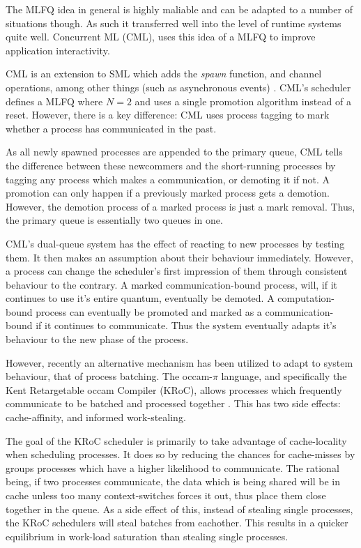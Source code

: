 The MLFQ idea in general is highly maliable and can be adapted to a number of 
situations though. As such it transferred well into the level of runtime 
systems quite well. Concurrent ML (CML), uses this idea of a MLFQ to improve 
application interactivity. 

CML is an extension to SML which adds the \emph{spawn} function, and channel 
operations, among other things (such as asynchronous events) 
\cite{reppy1993concurrent}. CML's scheduler defines a MLFQ where $N=2$ and 
uses a single promotion algorithm instead of a reset. However, there is a key
difference: CML uses process tagging to mark whether a process has 
communicated in the past. 

As all newly spawned processes are appended to the
primary queue, CML tells the difference between these newcommers and the
short-running processes by tagging any process which makes a communication, or
demoting it if not. A promotion can only happen if a previously marked process
gets a demotion. However, the demotion process of a marked process is just a 
mark removal. Thus, the primary queue is essentially two queues in one. 

CML's dual-queue system has the effect of reacting to new processes by testing 
them. It then makes an assumption about their behaviour immediately. However, a
process can change the scheduler's first impression of them through consistent
behaviour to the contrary. A marked communication-bound process, will, if it
continues to use it's entire quantum, eventually be demoted. A computation-bound
process can eventually be promoted and marked as a communication-bound if it 
continues to communicate. Thus the system eventually adapts it's behaviour to
the new phase of the process.

However, recently an alternative mechanism has been utilized to adapt to system
behaviour, that of process batching. The occam-$\pi$ language, and specifically 
the Kent Retargetable occam Compiler (KRoC), allows processes which frequently
communicate to be batched and processed together \cite{ritson2012multicore}. 
This has two side effects: cache-affinity, and informed work-stealing.

The goal of the KRoC scheduler is primarily to take advantage of cache-locality
when scheduling processes. It does so by reducing the chances for cache-misses
by groups processes which have a higher likelihood to communicate. The rational
being, if two processes communicate, the data which is being shared will be in
cache unless too many context-switches forces it out, thus place them close
together in the queue. As a side effect of this, instead of stealing single 
processes, the KRoC schedulers will steal batches from eachother. This results
in a quicker equilibrium in work-load saturation than stealing single processes.

